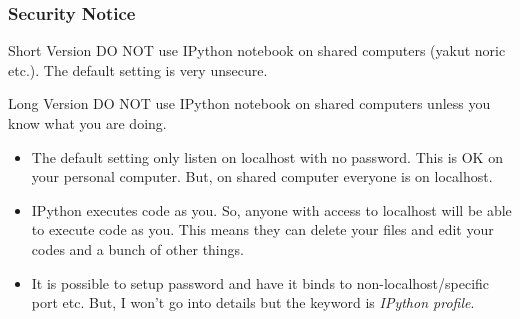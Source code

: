\documentclass{beamer}
\begin{document}

\frame
{
	\frametitle{Security Notice}
	\begin{block}{Short Version}
		{\color{red}DO NOT} use IPython notebook on shared computers (yakut noric etc.). The default setting is very unsecure.
	\end{block}
	\begin{block}{Long Version}
		{\color{red}DO NOT} use IPython notebook on shared computers unless you know what you are doing.
		\begin{itemize}
			\item The default setting only listen on localhost with no password. This is OK on your personal computer. But, on shared computer everyone is on localhost.
			\item IPython executes code as you. So, anyone with access to localhost will be able
			      to execute code as you. This means they can delete your files and edit your codes and a bunch of other things.
			\item It is possible to setup password and have it binds to non-localhost/specific port etc. But, I won't go into details but the keyword is \emph{IPython profile}.
		\end{itemize}
	\end{block}
}
\end{document}
